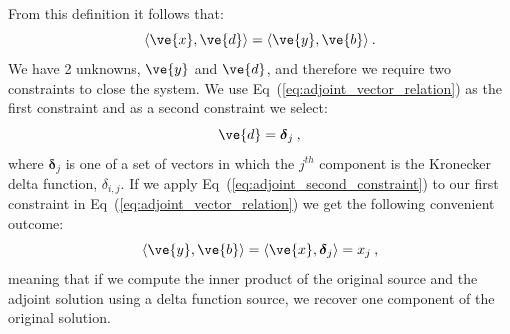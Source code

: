 \documentclass[preprint,11pt]{elsarticle}
\begin{document}
From this definition it follows that:
\begin{equation}
  \langle \ve{x}, \ve{d} \rangle = \langle \ve{y}, \ve{b} \rangle\:.
  \label{eq:adjoint_vector_relation}
\end{equation}
We have 2 unknowns, $\ve{y}$ and $\ve{d}$, and therefore we require two
constraints to close the system. We use Eq~(\ref{eq:adjoint_vector_relation})
as the first constraint and as a second constraint we select:
\begin{equation}
  \ve{d} = \boldsymbol{\delta}_j\:,
  \label{eq:adjoint_second_constraint}
\end{equation}
where $\boldsymbol{\delta}_j$ is one of a set of vectors in which the $j^{th}$
component is the Kronecker delta function, $\delta_{i,j}$. If we apply
Eq~(\ref{eq:adjoint_second_constraint}) to our first constraint in
Eq~(\ref{eq:adjoint_vector_relation}) we get the following convenient
outcome:
\begin{equation}
  \langle \ve{y}, \ve{b} \rangle = \langle \ve{x},
  \boldsymbol{\delta}_j \rangle = x_j \:,
  \label{eq:inner_product_constraint}
\end{equation}
meaning that if we compute the inner product of the original source and the
adjoint solution using a delta function source, we recover one component of
the original solution.
\end{document}
